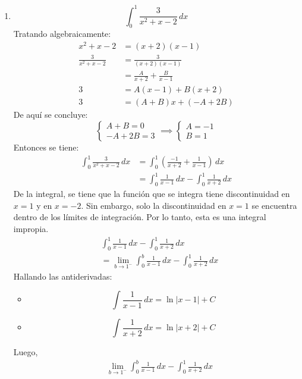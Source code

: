 \begin{multicols}{2}
\begin{enumerate}
    \item
    \[
      \displaystyle \int_{0}^{1} \frac{3}{x^{2}+x-2} \, dx
    \]
    Tratando algebraicamente:
    \[\begin{aligned}
      x^{2}+x-2 &= (x+2)(x-1) \\
      \frac{3}{x^{2}+x-2} &= \frac{3}{(x+2)(x-1)} \\
      &= \frac{A}{x+2} + \frac{B}{x-1} \\
      3 &= A(x-1) + B(x+2) \\
      3 &= (A+B)x + (-A+2B)
    \end{aligned}
    \]
    De aquí se concluye:
    \[
    \begin{cases}
    A + B = 0 \\
    - A + 2B = 3
    \end{cases} \implies 
    \begin{cases}
    A = -1 \\
    B = 1
    \end{cases}
    \]
    Entonces se tiene:
    \[\begin{aligned}
      \int_{0}^{1} \frac{3}{x^{2}+x-2} \, dx &= \int_{0}^{1} \left( \frac{-1}{x+2} + \frac{1}{x-1} \right) \, dx \\  
      &= \int_{0}^{1} \frac{1}{x-1} \, dx - \int_{0}^{1} \frac{1}{x+2} \, dx
      \end{aligned}
    \]
    De la integral, se tiene que la función que se integra tiene discontinuidad en \( x = 1 \) y en \( x = -2 \). Sin embargo, solo la discontinuidad en \( x = 1 \) se encuentra dentro de los límites de integración. Por lo tanto, esta es una integral impropia.
    \[
    \begin{aligned}
    &\int_{0}^{1} \frac{1}{x-1} \, dx - \int_{0}^{1} \frac{1}{x+2} \, dx \\
    &= \lim_{b \to 1^{-}} \int_{0}^{b} \frac{1}{x-1} \, dx - \int_{0}^{1} \frac{1}{x+2} \, dx
    \end{aligned}
    \]
    Hallando las antiderivadas:
    \begin{itemize}
      \item \[
        \int \frac{1}{x-1} \, dx = \ln{|x-1|} + C
      \]
      \item \[
        \int \frac{1}{x+2} \, dx = \ln{|x+2|} + C
      \]
    \end{itemize}
    Luego,
    \[
      \begin{aligned}
        &\lim_{b \to 1^{-}} \int_{0}^{b} \frac{1}{x-1} \, dx - \int_{0}^{1} \frac{1}{x+2} \, dx \\

\end{aligned}\]
\end{enumerate}
\end{multicols}
